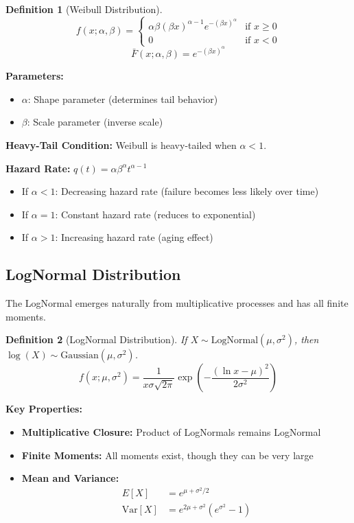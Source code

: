 \documentclass[11pt]{article}
\newtheorem{definition}{Definition}
\begin{document}
\begin{definition}[Weibull Distribution]
$$f(x; \alpha, \beta) = \begin{cases}
\alpha\beta(\beta x)^{\alpha-1}e^{-(\beta x)^{\alpha}} & \text{if } x \geq 0 \\
0 & \text{if } x < 0
\end{cases}$$
$$\bar{F}(x; \alpha, \beta) = e^{-(\beta x)^{\alpha}}$$
\end{definition}

\textbf{Parameters:}
\begin{itemize}
\item $\alpha$: Shape parameter (determines tail behavior)
\item $\beta$: Scale parameter (inverse scale)
\end{itemize}

\textbf{Heavy-Tail Condition:} Weibull is heavy-tailed when $\alpha < 1$.

\textbf{Hazard Rate:} $q(t) = \alpha\beta^{\alpha}t^{\alpha-1}$
\begin{itemize}
\item If $\alpha < 1$: Decreasing hazard rate (failure becomes less likely over time)
\item If $\alpha = 1$: Constant hazard rate (reduces to exponential)
\item If $\alpha > 1$: Increasing hazard rate (aging effect)
\end{itemize}

\subsection{LogNormal Distribution}

The LogNormal emerges naturally from multiplicative processes and has all finite moments.

\begin{definition}[LogNormal Distribution]
If $X \sim \text{LogNormal}(\mu, \sigma^2)$, then $\log(X) \sim \text{Gaussian}(\mu, \sigma^2)$.
$$f(x; \mu, \sigma^2) = \frac{1}{x\sigma\sqrt{2\pi}} \exp\left(-\frac{(\ln x - \mu)^2}{2\sigma^2}\right)$$
\end{definition}

\textbf{Key Properties:}
\begin{itemize}
\item \textbf{Multiplicative Closure:} Product of LogNormals remains LogNormal
\item \textbf{Finite Moments:} All moments exist, though they can be very large
\item \textbf{Mean and Variance:}
  \begin{align}
  E[X] &= e^{\mu + \sigma^2/2}\\
  \text{Var}[X] &= e^{2\mu + \sigma^2}(e^{\sigma^2} - 1)
  \end{align}
\end{itemize}
\end{document}
